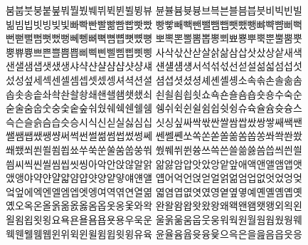 붐붑붓붕붙붚붜붤붰붸뷔뷕뷘뷜뷩뷰 뷴뷸븀븃븅브븍븐블븜븝븟비빅빈빌 \\



빎빔빕빗빙빚빛빠빡빤빨빪빰빱빳빴 빵빻빼빽뺀뺄뺌뺍뺏뺐뺑뺘뺙뺨뻐뻑 \\

뻔뻗뻘뻠뻣뻤뻥뻬뼁뼈뼉뼘뼙뼛뼜뼝 뽀뽁뽄뽈뽐뽑뽕뾔뾰뿅뿌뿍뿐뿔뿜뿟 \\

뿡쀼쁑쁘쁜쁠쁨쁩삐삑삔삘삠삡삣삥 사삭삯산삳살삵삶삼삽삿샀상샅새색 \\

샌샐샘샙샛샜생샤샥샨샬샴샵샷샹섀 섄섈섐섕서석섞섟선섣설섦섧섬섭섯 \\

섰성섶세섹센셀셈셉셋셌셍셔셕션셜 셤셥셧셨셩셰셴셸솅소속솎손솔솖솜 \\

솝솟송솥솨솩솬솰솽쇄쇈쇌쇔쇗쇘쇠 쇤쇨쇰쇱쇳쇼쇽숀숄숌숍숏숑수숙순 \\

숟술숨숩숫숭숯숱숲숴쉈쉐쉑쉔쉘쉠 쉥쉬쉭쉰쉴쉼쉽쉿슁슈슉슐슘슛슝스 \\

슥슨슬슭슴습슷승시식신싣실싫심십 싯싱싶싸싹싻싼쌀쌈쌉쌌쌍쌓쌔쌕쌘 \\



쌜쌤쌥쌨쌩썅써썩썬썰썲썸썹썼썽쎄 쎈쎌쏀쏘쏙쏜쏟쏠쏢쏨쏩쏭쏴쏵쏸쐈 \\

쐐쐤쐬쐰쐴쐼쐽쑈쑤쑥쑨쑬쑴쑵쑹쒀 쒔쒜쒸쒼쓩쓰쓱쓴쓸쓺쓿씀씁씌씐씔 \\

씜씨씩씬씰씸씹씻씽아악안앉않알앍 앎앓암압앗았앙앝앞애액앤앨앰앱앳 \\

앴앵야약얀얄얇얌얍얏양얕얗얘얜얠 얩어억언얹얻얼얽얾엄업없엇었엉엊 \\

엌엎에엑엔엘엠엡엣엥여역엮연열엶 엷염엽엾엿였영옅옆옇예옌옐옘옙옛 \\

옜오옥온올옭옮옰옳옴옵옷옹옻와왁 완왈왐왑왓왔왕왜왝왠왬왯왱외왹왼 \\

욀욈욉욋욍요욕욘욜욤욥욧용우욱운 울욹욺움웁웃웅워웍원월웜웝웠웡웨 \\

웩웬웰웸웹윈위윅윈윌윔윕윗윙유육 윤율윰윱윳융윷으윽은을읊음읍읏응 \\



